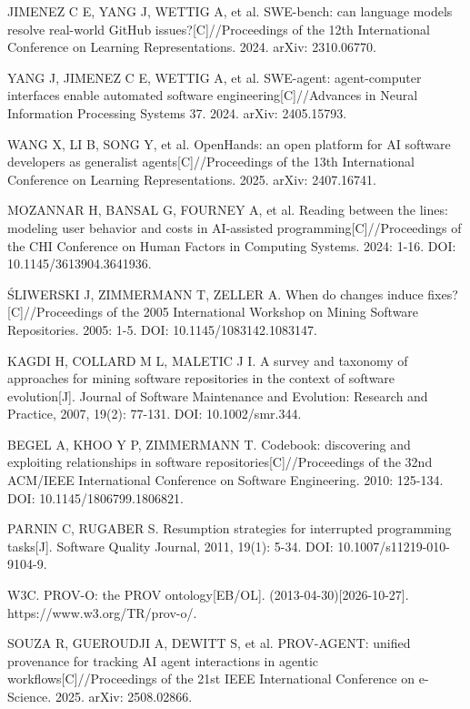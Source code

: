 {\linespread{1}\selectfont\raggedright
\begin{tjreflist}
\setlength{\itemsep}{1.5pt}
\item JIMENEZ C E, YANG J, WETTIG A, et al. SWE-bench: can language models resolve real-world GitHub issues?[C]//Proceedings of the 12th International Conference on Learning Representations. 2024. arXiv: 2310.06770.
\item YANG J, JIMENEZ C E, WETTIG A, et al. SWE-agent: agent-computer interfaces enable automated software engineering[C]//Advances in Neural Information Processing Systems 37. 2024. arXiv: 2405.15793.
\item WANG X, LI B, SONG Y, et al. OpenHands: an open platform for AI software developers as generalist agents[C]//Proceedings of the 13th International Conference on Learning Representations. 2025. arXiv: 2407.16741.
\item MOZANNAR H, BANSAL G, FOURNEY A, et al. Reading between the lines: modeling user behavior and costs in AI-assisted programming[C]//Proceedings of the CHI Conference on Human Factors in Computing Systems. 2024: 1-16. DOI: 10.1145/3613904.3641936.
\item ŚLIWERSKI J, ZIMMERMANN T, ZELLER A. When do changes induce fixes?[C]//Proceedings of the 2005 International Workshop on Mining Software Repositories. 2005: 1-5. DOI: 10.1145/1083142.1083147.
\item KAGDI H, COLLARD M L, MALETIC J I. A survey and taxonomy of approaches for mining software repositories in the context of software evolution[J]. Journal of Software Maintenance and Evolution: Research and Practice, 2007, 19(2): 77-131. DOI: 10.1002/smr.344.
\item BEGEL A, KHOO Y P, ZIMMERMANN T. Codebook: discovering and exploiting relationships in software repositories[C]//Proceedings of the 32nd ACM/IEEE International Conference on Software Engineering. 2010: 125-134. DOI: 10.1145/1806799.1806821.
\item PARNIN C, RUGABER S. Resumption strategies for interrupted programming tasks[J]. Software Quality Journal, 2011, 19(1): 5-34. DOI: 10.1007/s11219-010-9104-9.
\item W3C. PROV-O: the PROV ontology[EB/OL]. (2013-04-30)[2026-10-27]. https://www.w3.org/TR/prov-o/.
\item SOUZA R, GUEROUDJI A, DEWITT S, et al. PROV-AGENT: unified provenance for tracking AI agent interactions in agentic workflows[C]//Proceedings of the 21st IEEE International Conference on e-Science. 2025. arXiv: 2508.02866.

\end{tjreflist}}
